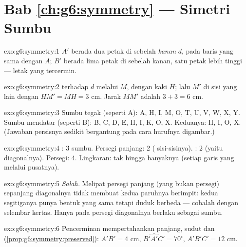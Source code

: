 \section*{Bab \ref{ch:g6:symmetry} --- Simetri Sumbu}

\begin{solution}{exo:g6:symmetry:1}
$A'$ berada dua petak di sebelah \emph{kanan} $d$, pada baris yang
sama dengan $A$; $B'$ berada lima petak di sebelah kanan, satu petak
lebih tinggi --- letak yang tercermin.
\end{solution}

\begin{solution}{exo:g6:symmetry:2}
 terhadap $d$ melalui $M$, dengan kaki $H$; lalu $M'$
di sisi yang lain dengan $HM' = MH = 3$ cm. Jarak $MM'$ adalah
$3 + 3 = 6$ cm.
\end{solution}

\begin{solution}{exo:g6:symmetry:3}
Sumbu tegak (seperti A): A, H, I, M, O, T, U, V, W, X, Y.
Sumbu mendatar (seperti B): B, C, D, E, H, I, K, O, X.
Keduanya: H, I, O, X.
(Jawaban persisnya sedikit bergantung pada cara hurufnya digambar.)
\end{solution}

\begin{solution}{exo:g6:symmetry:4}
: $3$ sumbu. Persegi panjang: $2$ (
sisi-sisinya). : $2$ (yaitu diagonalnya). Persegi: $4$.
Lingkaran: tak hingga banyaknya (setiap garis yang melalui pusatnya).
\end{solution}

\begin{solution}{exo:g6:symmetry:5}
\emph{Salah.} Melipat persegi panjang (yang bukan persegi) sepanjang
diagonalnya tidak membuat kedua paruhnya berimpit: kedua segitiganya
punya bentuk yang sama tetapi duduk berbeda --- cobalah dengan
selembar kertas. Hanya pada persegi diagonalnya berlaku sebagai sumbu.
\end{solution}

\begin{solution}{exo:g6:symmetry:6}
Pencerminan mempertahankan panjang, sudut dan 
(\cref{prop:g6:symmetry:preserved}): $A'B' = 4$ cm,
$\widehat{B'A'C'} = 70^\circ$,  $A'B'C' = 12$ cm.
\end{solution}

